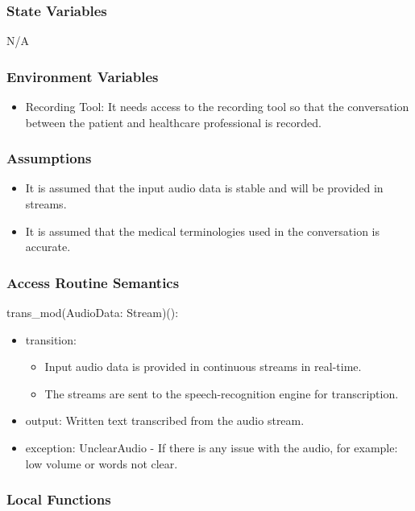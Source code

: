 \documentclass[12pt, titlepage]{article}
\begin{document}
\subsubsection{State Variables}

N/A

\subsubsection{Environment Variables}

\begin{itemize}
  \item Recording Tool: It needs access to the recording tool so that the conversation between the patient and healthcare professional is recorded.
\end{itemize}

\subsubsection{Assumptions}

\begin{itemize}
  \item It is assumed that the input audio data is stable and will be provided in streams.
  \item It is assumed that the medical terminologies used in the conversation is accurate.
\end{itemize}

\subsubsection{Access Routine Semantics}

\noindent trans_mod(AudioData: Stream)(): 
\begin{itemize}
\item transition:
\begin{itemize}
  \item Input audio data is provided in continuous streams in real-time.
  \item The streams are sent to the speech-recognition engine for transcription.
\end{itemize} 
\item output: Written text transcribed from the audio stream. 
\item exception: UnclearAudio - If there is any issue with the audio, for example: low volume or words not clear.  
\end{itemize}

\subsubsection{Local Functions}
\end{document}
